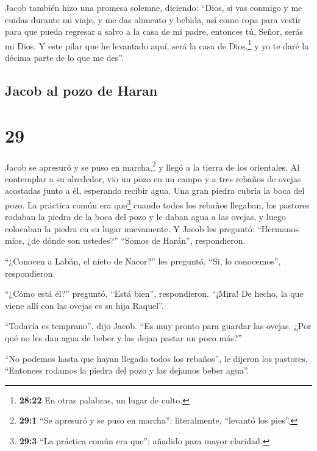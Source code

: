  Jacob también hizo una promesa solemne, diciendo:
``Dios, si vas conmigo y me cuidas durante mi viaje, y me das alimento y
bebida, así como ropa para vestir  para que pueda
regresar a salvo a la casa de mi padre, entonces tú, Señor, serás mi
Dios.  Y este pilar que he levantado aquí, será la casa
de Dios,\footnote{\textbf{28:22} En otras palabras, un lugar de culto.}
y yo te daré la décima parte de lo que me des''.

\hypertarget{jacob-al-pozo-de-haran}{%
\subsection{Jacob al pozo de Haran}\label{jacob-al-pozo-de-haran}}

\hypertarget{section-28}{%
\section{29}\label{section-28}}

 Jacob se apresuró y se puso en marcha,\footnote{\textbf{29:1}
  ``Se apresuró y se puso en marcha'': literalmente, ``levantó los
  pies''.} y llegó a la tierra de los orientales.  Al
contemplar a su alrededor, vio un pozo en un campo y a tres rebaños de
ovejas acostadas junto a él, esperando recibir agua. Una gran piedra
cubría la boca del pozo.  La práctica común era
que\footnote{\textbf{29:3} ``La práctica común era que'': añadido para
  mayor claridad.} cuando todos los rebaños llegaban, los pastores
rodaban la piedra de la boca del pozo y le daban agua a las ovejas, y
luego colocaban la piedra en su lugar nuevamente.  Y Jacob
les preguntó: ``Hermanos míos, ¿de dónde son ustedes?'' ``Somos de
Harán'', respondieron.

 ``¿Conocen a Labán, el nieto de Nacor?'' les preguntó.
``Si, lo conocemos'', respondieron.

 ``¿Cómo está él?'' preguntó. ``Está bien'', respondieron.
``¡Mira! De hecho, la que viene allí con las ovejas es su hija Raquel''.

 ``Todavía es temprano'', dijo Jacob. ``Es muy pronto para
guardar las ovejas. ¿Por qué no les dan agua de beber y las dejan pastar
un poco más?''

 ``No podemos hasta que hayan llegado todos los rebaños'',
le dijeron los pastores. ``Entonces rodamos la piedra del pozo y las
dejamos beber agua''.


